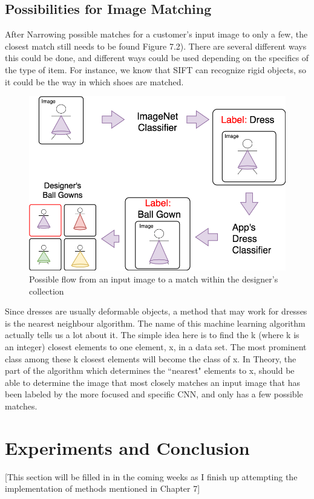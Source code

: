 \documentclass[12pt]{report} %
\begin{document}
\section{Possibilities for Image Matching}
	After Narrowing possible matches for a customer's input image to only a few, the closest match still needs to be found Figure 7.2). There are several different ways this could be done, and different ways could be used depending on the specifics of the type of item. For instance, we know that SIFT\cite{lowe1999object} can recognize rigid objects, so it could be the way in which shoes are matched. 
\begin{figure}
\centering
\includegraphics[width=6in]{app_flow}
\caption[Flow from Image to Match]
	{Possible flow from an input image to a match within the designer's collection}
\end{figure}		
	
	Since dresses are usually deformable objects, a method that may work for dresses is the nearest neighbour algorithm. The name of this machine learning algorithm actually tells us a lot about it. The simple idea here is to find the k (where k is an integer) closest elements to one element, x,  in a data set. The most prominent class among these k closest elements will become the class of x. In Theory, the part of the algorithm which determines the ``nearest" elements to x, should be able to determine the image that most closely matches an input image that has been labeled by the more focused and specific CNN, and only has a few possible matches.\cite{nearestNeighbour}

\chapter{Experiments and Conclusion}
[This section will be filled in in the coming weeks as I finish up attempting the implementation of methods mentioned in Chapter 7]
		


\end{document}
